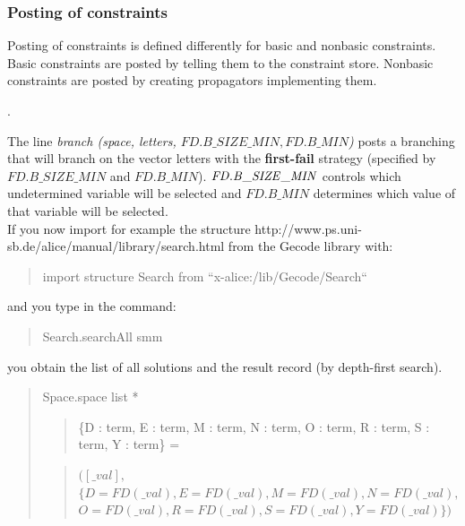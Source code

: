 \documentclass[a4paper]{scrartcl}
\begin{document}
\subsubsection{Posting of constraints}
Posting of constraints is defined differently for basic and 
nonbasic constraints. Basic constraints are posted by telling 
them to the constraint store. Nonbasic constraints are posted 
by creating propagators implementing them.
\par
{}. 
\par
The line {\it branch (space, letters, $ FD.B\_SIZE\_MIN, FD.B\_MIN$)} posts 
a branching that will branch on the vector letters with the 
{\bf first-fail} strategy (specified by $FD.B\_SIZE\_MIN$ and $FD.B\_MIN$). 
${\it FD.B\_SIZE\_MIN}$ controls which undetermined variable will be
selected and {\it $ FD.B\_MIN $} determines which value of that variable
will be selected.\\
If you now import for example the structure
\htmladdnormallink{\textcolor{blue}{Search}}
{http://www.ps.uni-sb.de/alice/manual/library/search.html}
from the Gecode library with:\\
\begin{quote}
import structure Search from ``x-alice:/lib/Gecode/Search``\\
\end{quote}
and you type in the command:\\
\begin{quote}
Search.searchAll smm\\
\end{quote}
you obtain the list of all solutions and the result record
(by depth-first search). \\
\begin{quote}
Space.space list *
\begin{quote}
      \{D : term, E : term, M : term, N : term, O : term, R : term, S : term,
       Y : term\} =
\end{quote}
\begin{quote}
   $ ([\_val],$\\
   $ \{D = FD (\_val), E = FD (\_val), M = FD (\_val), N = FD (\_val),$\\ 
   $ O = FD (\_val), R = FD (\_val), S = FD (\_val), Y = FD (\_val)\})$\\
\end{quote}
\end{quote}
\end{document}
